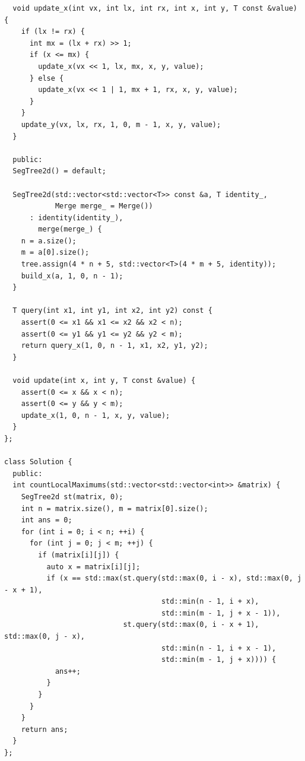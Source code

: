 \documentclass[UTF8,twoside]{ctexart}
\begin{document}
\begin{lstlisting}
  void update_x(int vx, int lx, int rx, int x, int y, T const &value) {
    if (lx != rx) {
      int mx = (lx + rx) >> 1;
      if (x <= mx) {
        update_x(vx << 1, lx, mx, x, y, value);
      } else {
        update_x(vx << 1 | 1, mx + 1, rx, x, y, value);
      }
    }
    update_y(vx, lx, rx, 1, 0, m - 1, x, y, value);
  }

  public:
  SegTree2d() = default;

  SegTree2d(std::vector<std::vector<T>> const &a, T identity_,
            Merge merge_ = Merge())
      : identity(identity_),
        merge(merge_) {
    n = a.size();
    m = a[0].size();
    tree.assign(4 * n + 5, std::vector<T>(4 * m + 5, identity));
    build_x(a, 1, 0, n - 1);
  }

  T query(int x1, int y1, int x2, int y2) const {
    assert(0 <= x1 && x1 <= x2 && x2 < n);
    assert(0 <= y1 && y1 <= y2 && y2 < m);
    return query_x(1, 0, n - 1, x1, x2, y1, y2);
  }

  void update(int x, int y, T const &value) {
    assert(0 <= x && x < n);
    assert(0 <= y && y < m);
    update_x(1, 0, n - 1, x, y, value);
  }
};

class Solution {
  public:
  int countLocalMaximums(std::vector<std::vector<int>> &matrix) {
    SegTree2d st(matrix, 0);
    int n = matrix.size(), m = matrix[0].size();
    int ans = 0;
    for (int i = 0; i < n; ++i) {
      for (int j = 0; j < m; ++j) {
        if (matrix[i][j]) {
          auto x = matrix[i][j];
          if (x == std::max(st.query(std::max(0, i - x), std::max(0, j - x + 1),
                                     std::min(n - 1, i + x),
                                     std::min(m - 1, j + x - 1)),
                            st.query(std::max(0, i - x + 1), std::max(0, j - x),
                                     std::min(n - 1, i + x - 1),
                                     std::min(m - 1, j + x)))) {
            ans++;
          }
        }
      }
    }
    return ans;
  }
};

\end{lstlisting}
\end{document}
